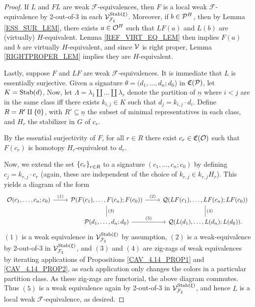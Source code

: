 \documentclass[a4paper,10pt
,draft
]{article}%
\renewcommand{\F}{\mathcal F}
\newcommand{\Q}{\mathcal Q}
\renewcommand{\1}{\ensuremath{\mathbb{id}}}
\begin{document}
\begin{proof}
      If $L$ and $FL$ are weak $\F$-equivalences,
      then $F$ is a local weak $\F$-equivalence by 2-out-of-3 in each $\V^{\Stab(\ksi)}_{\F_\ksi}$.
      Moreover, if $b \in \P^H$, then by Lemma \ref{ESS_SUR_LEM}, there exists $a \in \O^H$ such that
      $LF(a)$ and $L(b)$ are (virtually) $H$-equivalent.
      Lemma \ref{REF_VIRT_EQ_LEM} then implies $F(a)$ and $b$ are virtually $H$-equivalent, 
      and since $\V$ is right proper, Lemma \ref{RIGHTPROPER_LEM} implies they are $H$-equivalent.

      Lastly, suppose $F$ and $LF$ are weak $\F$-equivalences.
      It is immediate that $L$ is essentially surjective.
      Given a signature $\theta = (d_1,\ldots,d_n;d_0$) in $\C(\P)$, let $K = \Stab(d)$,
      Now, let $\Lambda = \lambda_1 \amalg \dots \amalg \lambda_r$ denote the partition of $\underline{n}$
      where $i < j$ are in the same class iff there exists $k_{i,j} \in K$ such that $d_j = k_{i,j} \cdot d_i$.
      Define $R  = R' \amalg \set{0}$, with $R' \subseteq \underline{n}$ the subset of minimal representatives in each class,
      and $H_r$ the stabilizer in $G$ of $c_r$.

      By the essential surjectivity of $F$, for all $r \in R$ there exist $c_r \in \C(\O)$ such that
      $F(c_r)$ is homotopy $H_r$-equivalent to $d_r$.

      Now, we extend the set $\set{c_r}_{r\in R}$ to a signature $(c_1,\ldots, c_n;c_0)$ by defining $c_j = k_{r,j} \cdot c_r$
      (again, these are independent of the choice of $k_{r,j} \in k_{r,j}H_r$).
      This yields a diagram of the form
      \begin{equation}
            \label{TWOOFTHREE_EQ}
            \begin{tikzcd}
                  \O(c_1,\ldots, c_n;c_0) \arrow[r, "(1)"]
                  &
                  \P(F(c_1),\ldots, F(c_n); F(c_0)) \arrow[d,dash, "(3)"] \arrow[r, "(2)"]
                  &
                  \Q(LF(c_1),\ldots, LF(c_n);LF(c_0)) \arrow[d, dash, "(4)"]
                  \\
                  &
                  \P(d_1,\ldots, d_n;d_0) \arrow[r, "(5)"]
                  &
                  \Q(L(d_1),\ldots, L(d_n); L(d_0)).
            \end{tikzcd}
      \end{equation}
      $(1)$ is a weak equivalence in $\V^{\Stab(\ksi)}_{\F_\ksi}$ by assumption,
      $(2)$ is a weak-equivalence by 2-out-of-3 in $\V^{\Stab(\ksi)}_{\F_\ksi}$, and
      $(3)$ and $(4)$ are zig-zags of weak equivalences by iterating applications of
      Propositions \ref{CAV_4.14_PROP1} and \ref{CAV_4.14_PROP2}, %
      as each application only changes the colors in a particular partition class.
      As these zig-zags are functorial, the above diagram commutes.
      Thus $(5)$ is a weak equivalence again by 2-out-of-3 in $\V^{\Stab(\ksi)}_{\F_\ksi}$, and hence
      $L$ is a local weak $\F$-equivalence, as desired.
\end{proof}
\end{document}
